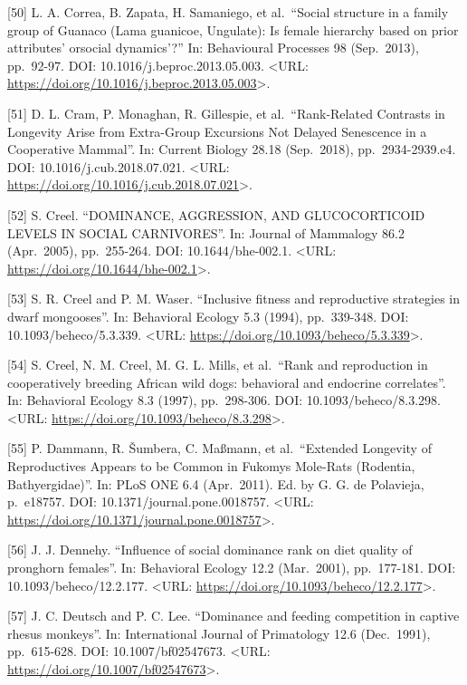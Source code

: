 \documentclass[
]{article}
\begin{document}
{[}50{]} L. A. Correa, B. Zapata, H. Samaniego, et al.~``Social
structure in a family group of Guanaco (Lama guanicoe, Ungulate): Is
female hierarchy based on prior attributes' orsocial dynamics'?'' In:
Behavioural Processes 98 (Sep.~2013), pp.~92-97. DOI:
10.1016/j.beproc.2013.05.003. \textless URL:
\url{https://doi.org/10.1016/j.beproc.2013.05.003}\textgreater.

{[}51{]} D. L. Cram, P. Monaghan, R. Gillespie, et al.~``Rank-Related
Contrasts in Longevity Arise from Extra-Group Excursions Not Delayed
Senescence in a Cooperative Mammal''. In: Current Biology 28.18
(Sep.~2018), pp.~2934-2939.e4. DOI: 10.1016/j.cub.2018.07.021.
\textless URL:
\url{https://doi.org/10.1016/j.cub.2018.07.021}\textgreater.

{[}52{]} S. Creel. ``DOMINANCE, AGGRESSION, AND GLUCOCORTICOID LEVELS IN
SOCIAL CARNIVORES''. In: Journal of Mammalogy 86.2 (Apr.~2005),
pp.~255-264. DOI: 10.1644/bhe-002.1. \textless URL:
\url{https://doi.org/10.1644/bhe-002.1}\textgreater.

{[}53{]} S. R. Creel and P. M. Waser. ``Inclusive fitness and
reproductive strategies in dwarf mongooses''. In: Behavioral Ecology 5.3
(1994), pp.~339-348. DOI: 10.1093/beheco/5.3.339. \textless URL:
\url{https://doi.org/10.1093/beheco/5.3.339}\textgreater.

{[}54{]} S. Creel, N. M. Creel, M. G. L. Mills, et al.~``Rank and
reproduction in cooperatively breeding African wild dogs: behavioral and
endocrine correlates''. In: Behavioral Ecology 8.3 (1997), pp.~298-306.
DOI: 10.1093/beheco/8.3.298. \textless URL:
\url{https://doi.org/10.1093/beheco/8.3.298}\textgreater.

{[}55{]} P. Dammann, R. Šumbera, C. Maßmann, et al.~``Extended Longevity
of Reproductives Appears to be Common in Fukomys Mole-Rats (Rodentia,
Bathyergidae)''. In: PLoS ONE 6.4 (Apr.~2011). Ed. by G. G. de
Polavieja, p.~e18757. DOI: 10.1371/journal.pone.0018757. \textless URL:
\url{https://doi.org/10.1371/journal.pone.0018757}\textgreater.

{[}56{]} J. J. Dennehy. ``Influence of social dominance rank on diet
quality of pronghorn females''. In: Behavioral Ecology 12.2 (Mar.~2001),
pp.~177-181. DOI: 10.1093/beheco/12.2.177. \textless URL:
\url{https://doi.org/10.1093/beheco/12.2.177}\textgreater.

{[}57{]} J. C. Deutsch and P. C. Lee. ``Dominance and feeding
competition in captive rhesus monkeys''. In: International Journal of
Primatology 12.6 (Dec.~1991), pp.~615-628. DOI: 10.1007/bf02547673.
\textless URL: \url{https://doi.org/10.1007/bf02547673}\textgreater.
\end{document}
